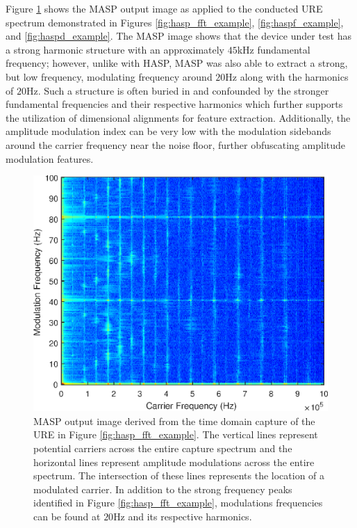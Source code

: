 Figure \ref{fig:masp_example} shows the MASP output image as applied to the conducted URE spectrum demonstrated in Figures \ref{fig:hasp_fft_example}, \ref{fig:haspf_example}, and \ref{fig:haspd_example}. The MASP image shows that the device under test has a strong harmonic structure with an approximately $45$kHz fundamental frequency; however, unlike with HASP, MASP was also able to extract a strong, but low frequency, modulating frequency around $20$Hz along with the harmonics of $20$Hz. Such a structure is often buried in and confounded by the stronger fundamental frequencies and their respective harmonics which further supports the utilization of dimensional alignments for feature extraction.  Additionally, the amplitude modulation index can be very low with the modulation sidebands around the carrier frequency near the noise floor, further obfuscating amplitude modulation features.

\begin{figure}[tp]
	\includegraphics[width=\textwidth]{./dasp_algorithm_results/masp_low_filenum_9601.eps}
	\centering
	\caption{MASP output image derived from the time domain capture of the URE in Figure \ref{fig:hasp_fft_example}.  The vertical lines represent potential carriers across the entire capture spectrum and the horizontal lines represent amplitude modulations across the entire spectrum.  The intersection of these lines represents the location of a modulated carrier.  In addition to the strong frequency peaks identified in Figure \ref{fig:hasp_fft_example}, modulations frequencies can be found at $20$Hz and its respective harmonics.}
	\label{fig:masp_example}
\end{figure}

